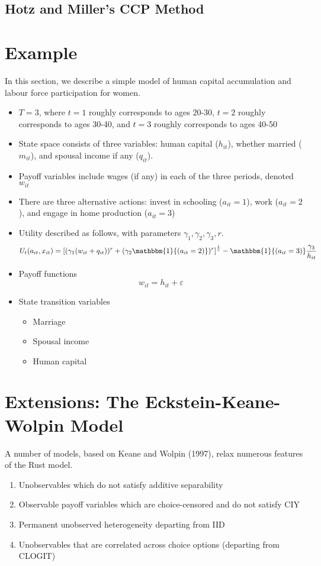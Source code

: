 \documentclass[11pt]{article}
\begin{document}
\subsection{Hotz and Miller's CCP Method}

\section{Example}
In this section, we describe a simple model of human capital accumulation and labour force participation for women.
\begin{itemize}
    \item $T = 3$, where $t=1$ roughly corresponds to ages 20-30, $t=2$ roughly corresponds to ages 30-40, and $t=3$ roughly corresponds to ages 40-50
    \item State space consists of three variables: human capital ($h_{it}$), whether married ($m_{it}$), and spousal income if any ($q_{it}$).
    \item Payoff variables include wages (if any) in each of the three periods, denoted $w_{it}$
    \item There are three alternative actions: invest in schooling ($a_{it} = 1$), work ($a_{it} = 2$), and engage in home production ($a_{it} = 3$)
    \item Utility described as follows, with parameters $\gamma_1,\gamma_2,\gamma_3,r$.
    \begin{align}
        U_t(a_{it},x_{it}) = \left[ (\gamma_1(w_{it}+q_{it}))^r + (\gamma_2 \mathbbm{1}{(a_{it}=2)})^r \right]^{\frac{1}{r}}- \mathbbm{1}{(a_{it} = 3)} \frac{\gamma_3}{h_{it}}
    \end{align}
    \item Payoff functions
    \begin{equation}
        w_{it} = h_{it} + \varepsilon
    \end{equation}
    \item State transition variables
    \begin{itemize}
        \item Marriage
        \item Spousal income
        \item Human capital
    \end{itemize}
\end{itemize}

\section{Extensions: The Eckstein-Keane-Wolpin Model}

A number of models, based on Keane and Wolpin (1997), relax numerous features of the Rust model.
\begin{enumerate}
    \item Unobservables which do not satisfy additive separability
    \item Observable payoff variables which are choice-censored and do not satisfy CIY
    \item Permanent unobserved heterogeneity departing from IID
    \item Unobservables that are correlated across choice options (departing from CLOGIT)
\end{enumerate}
\end{document}
